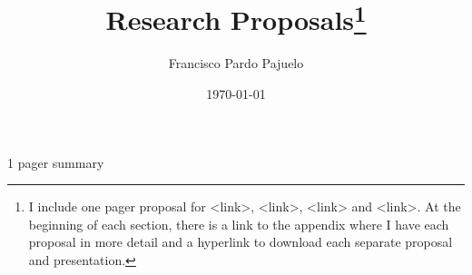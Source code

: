 \documentclass[PP]{AEA}
\let\footnote\thanks
\begin{document}
\title{Research Proposals\footnote{I include one pager proposal for <link>, <link>, <link> and <link>. At the beginning of each section, there is a link to the appendix where I have each proposal in more detail and a hyperlink to download each separate proposal and presentation.}}
\shortTitle{}
\author{
	Francisco Pardo Pajuelo
}

\date{\today}




 
1 pager summary


\end{document}
